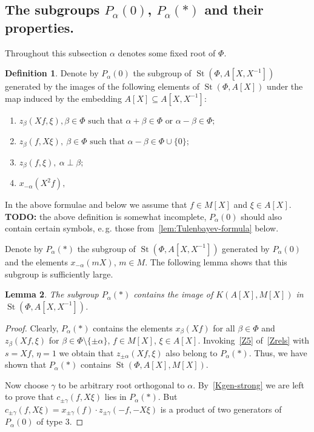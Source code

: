\documentclass[oneside, 8pt]{amsart}
\newtheorem{lemma}{Lemma}
\theoremstyle{remark}
\theoremstyle{definition}
\newtheorem{df}[lemma]{Definition} \Crefname{df}{Definition}{Definitions}
\DeclareMathOperator{\St}{St}
\numberwithin{equation}{section}
\begin{document}
\subsection{The subgroups $P_\alpha(0)$, $P_\alpha(*)$ and their properties.} Throughout this subsection $\alpha$ denotes some fixed root of $\Phi$.
\begin{df} \label{defP0}
Denote by $P_\alpha(0)$ the subgroup of $\St(\Phi, A[X, X^{-1}])$ generated by the images of the following elements of $\St(\Phi, A[X])$ under the
 map induced by the embedding $A[X] \subseteq A[X, X^{-1}]$:
\begin{enumerate}
 \item $z_{\beta}(Xf, \xi), \beta \in \Phi \text{ such that }\alpha + \beta \in \Phi\text{ or } \alpha - \beta \in \Phi;$
 \item $z_{\beta}(f, X\xi),\ \beta \in \Phi \text{ such that }\alpha - \beta \in \Phi \cup \{0\};$
 \item $z_{\beta}(f, \xi),\ \alpha \perp \beta;$
 \item $x_{-\alpha}(X^2f),$
\end{enumerate}
In the above formulae and below we assume that $f \in M[X]$ and $\xi \in A[X]$.
{\bf TODO:} the above definition is somewhat incomplete, $P_\alpha(0)$ should also contain certain symbols, e.\,g. those from~\cref{lem:Tulenbayev-formula} below. \end{df}

Denote by $P_\alpha(*)$ the subgroup of $\St(\Phi, A[X, X^{-1}])$ generated by $P_\alpha(0)$ and the elements $x_{-\alpha}(mX)$, $m \in M$. The following lemma shows that this subgroup is sufficiently large.
\begin{lemma} \label{Pstar-large} The subgroup $P_\alpha(*)$ contains the image of $K(A[X], M[X])$ in $\St(\Phi, A[X, X^{-1}])$. \end{lemma}
\begin{proof} Clearly, $P_\alpha(*)$ contains the elements $x_\beta(Xf)$ for all $\beta \in \Phi$ and $z_\beta(Xf, \xi)$ for $\beta \in \Phi \setminus \{\pm \alpha\}$, $f \in M[X]$, $\xi\in A[X]$. 
Invoking~\eqref{Z5} of~\cref{Zrels} with $s = Xf$, $\eta = 1$ we obtain that $z_{\pm\alpha}(Xf, \xi)$ also belong to $P_{\alpha}(*)$. Thus, we have shown that $P_\alpha(*)$ contains $\St(\Phi, A[X], M[X])$.

Now choose $\gamma$ to be arbitrary root orthogonal to $\alpha$. By~\cref{Kgen-strong} we are left to prove that $c_{\pm \gamma}(f, X\xi)$ lies in $P_\alpha(*)$. 
But $c_{\pm \gamma}(f, X\xi) = x_{\pm \gamma}(f) \cdot z_{\pm \gamma}(-f, -X\xi)$ is a product of two generators of $P_\alpha(0)$ of type 3. \end{proof}
\end{document}
